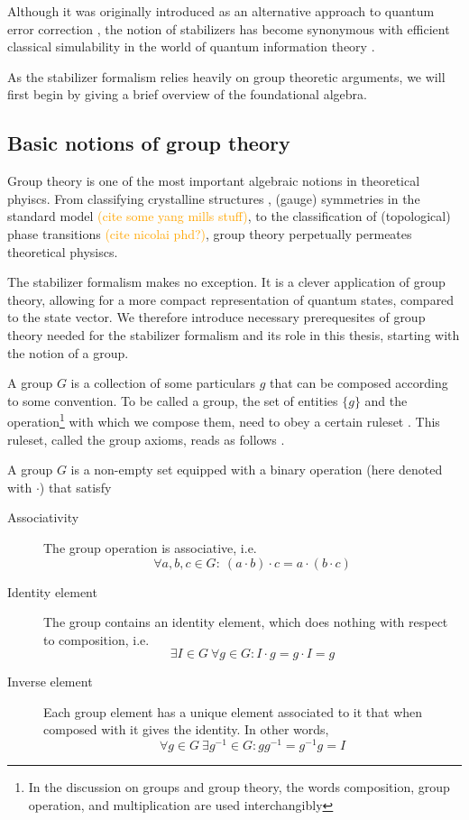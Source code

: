 Although it was originally introduced as an alternative approach to quantum error
correction
\cite{gottesmanStabilizerCodesQuantum1997,gottesmanSurvivingQuantumComputer2024}, the notion of
stabilizers has become synonymous with efficient classical simulability in the
world of quantum information theory
\cite{nielsenQuantumComputationQuantum2010,aaronsonImprovedSimulationStabilizer2004,fisherRandomQuantumCircuits2023}.

As the stabilizer formalism relies heavily on group theoretic arguments, we
will first begin by giving a brief overview of the foundational algebra.
\subsection{Basic notions of group theory}
Group theory is one of the most important algebraic notions in theoretical
phyiscs. From classifying crystalline structures
\cite{ashcroftSolidStatePhysics1978},
(gauge) symmetries in the standard model \textcolor{orange}{(cite some yang
mills stuff)}, to the
classification of (topological) phase transitions \textcolor{orange}{(cite
nicolai phd?)}, group
theory perpetually permeates theoretical physiscs.

The stabilizer formalism makes no exception. It is a clever application of
group theory, allowing for a more compact representation of quantum states,
compared to the state vector. We therefore introduce necessary prerequesites of
group theory needed for the stabilizer formalism and its role in this thesis,
starting with the notion of a group.

A group $G$ is a collection of some particulars $g$ that can be composed
according to some convention. To be called a group, the set of entities
$\{g\}$ and the operation\footnote{In the discussion on groups and group
  theory, the words composition, group operation, and multiplication are used
interchangibly} with which we compose them, need to obey a certain
ruleset \cite{zeeGroupTheoryNutshell2016}. This ruleset, called the group axioms, reads as follows
\cite{stroppelHoehereMathematik12023}.

\begin{defn}[Group]\label{defn:group}
  A group $G$ is a non-empty set equipped with a binary operation (here denoted
  with $\cdot$) that satisfy
  \begin{description}
    \item[Associativity] The group operation is associative, i.e.
      $$\forall a,b,c \in G:\ (a\cdot b) \cdot c = a \cdot
      (b \cdot c)$$
    \item[Identity element] The group contains an identity element, which does
      nothing with respect to composition, i.e.
      $$\exists I\in G \ \forall g \in G : I\cdot g = g \cdot I = g$$
    \item[Inverse element] Each group element has a unique element associated
      to it that when composed with it gives the identity. In other words,
      $$\forall g \in G \ \exists g^{-1} \in G : g g^{-1} = g^{-1} g = I $$
  \end{description}
\end{defn}

